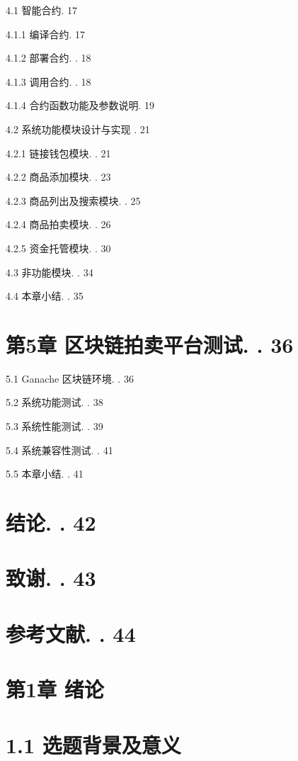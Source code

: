 \documentclass[
  10
]{article}
\begin{document}
4.1 智能合约. 17

4.1.1 编译合约. 17

4.1.2 部署合约. . 18

4.1.3 调用合约. . 18

4.1.4 合约函数功能及参数说明. 19

4.2 系统功能模块设计与实现 . 21

4.2.1 链接钱包模块. . 21

4.2.2 商品添加模块. . 23

4.2.3 商品列出及搜索模块. . 25

4.2.4 商品拍卖模块. . 26

4.2.5 资金托管模块. . 30

4.3 非功能模块. . 34

4.4 本章小结. . 35

\section{第5章 区块链拍卖平台测试. .
36}\label{ux7b2c5ux7ae0-ux533aux5757ux94feux62cdux5356ux5e73ux53f0ux6d4bux8bd5.-.-36}

5.1 Ganache 区块链环境. . 36

5.2 系统功能测试. . 38

5.3 系统性能测试. . 39

5.4 系统兼容性测试. . 41

5.5 本章小结. . 41

\section{结论. . 42}\label{ux7ed3ux8bba.-.-42}

\section{致谢. . 43}\label{ux81f4ux8c22.-.-43}

\section{参考文献. . 44}\label{ux53c2ux8003ux6587ux732e.-.-44}

\section{第1章 绪论}\label{ux7b2c1ux7ae0-ux7eeaux8bba}

\section{1.1
选题背景及意义}\label{ux9009ux9898ux80ccux666fux53caux610fux4e49}
\end{document}
